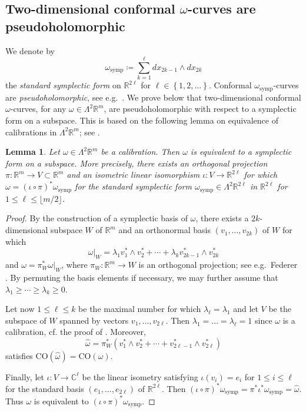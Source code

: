 \documentclass[a4paper,leqno,11pt]{amsart}
\numberwithin{equation}{section}
\newtheorem{lemma}[theorem]{Lemma}
\theoremstyle{remark}
\theoremstyle{remark}
\newcommand{\R}{\mathbb{R}}
\newcommand{\symp}{\mathrm{symp}}
\newcommand{\CO}{\mathrm{CO}}
\begin{document}
\subsection{Two-dimensional conformal $\omega$-curves are pseudoholomorphic}
\label{sec:two-dimensional-curves}
We denote by
\begin{equation*}
    \omega_{\symp}
    \coloneqq
    \sum_{ k = 1 }^{ \ell }
    dx_{2k-1} \wedge dx_{2k}
\end{equation*}
the \emph{standard symplectic form} on $\mathbb{R}^{ 2 \ell }$ for $\ell \in \left\{1,2,\dots\right\}$. Conformal $\omega_{\symp}$-curves are \emph{pseudoholomorphic}, see e.g.~\cite[Chapter 2]{McD:Sal:04}. We prove below that two-dimensional conformal $\omega$-curves, for any $\omega \in \Lambda^2 \mathbb{R}^m$, are pseudoholomorphic with respect to a symplectic form on a subspace. This is based on the following lemma on equivalence of calibrations in $\Lambda^2 \R^m$; see \cite[Theorem 7.16, p.~79]{Har:Law:82}.
\begin{lemma}
\label{lemma:symplectic-equivalence}
Let $\omega \in \Lambda^2 \R^m$ be a calibration. Then $\omega$ is equivalent to a symplectic form on a subspace. More precisely, there exists an orthogonal projection $\pi \colon \R^m \to V \subset \R^m$ and an isometric linear isomorphism $\iota \colon V \to \mathbb{R}^{2\ell}$ for which $\omega = ( \iota \circ \pi )^{*} \omega_{\symp}$ for the standard symplectic form $\omega_\symp \in \Lambda^2 \R^{2\ell}$ in $\R^{2\ell}$ for $1 \le \ell \le \lfloor m/2 \rfloor$.  
\end{lemma}

\begin{proof}
By the construction of a symplectic basis of $\omega$, there exists a $2k$-dimensional subspace $W$ of $\R^m$ and an orthonormal basis $(v_1,\ldots, v_{2k})$ of $W$ for which 
\[
\omega|_W = \lambda_1 v_1^* \wedge v_2^* + \cdots + \lambda_k v_{2k-1}^*\wedge v_{2k}^*
\]
and $\omega = \pi_W^* \omega|_W$, where $\pi_W \colon \R^m \to W$ is an orthogonal projection; see e.g.~Federer \cite[p.29]{Fed:69}. By permuting the basis elements if necessary, we may further assume that $\lambda_1 \ge \cdots \ge \lambda_k \ge 0$.

Let now $1\le \ell \le k$ be the maximal number for which $\lambda_\ell = \lambda_1$ and let $V$ be the subspace of $W$ spanned by vectors $v_1,\ldots, v_{2\ell}$. Then $\lambda_1 = \dots = \lambda_{\ell} = 1$ since $\omega$ is a calibration, cf. the proof of . Moreover, 
\[
\hat \omega = \pi_W^*(v_1^*\wedge v_2^* + \cdots + v_{2\ell-1}^* \wedge v_{2\ell}^*)
\]
satisfies $\CO(\hat \omega) = \CO(\omega)$.

Finally, let $\iota \colon V \to \mathbb{C}^{\ell}$ be the linear isometry satisfying $\iota(v_i) = e_i$ for $1 \leq i \leq \ell$ for the standard basis $(e_1,\ldots, e_{2\ell})$ of $\R^{2\ell}$. Then $( \iota \circ \pi )^*\omega_\symp = \pi^* \iota^* \omega_\symp = \hat \omega$. Thus $\omega$ is equivalent to $( \iota \circ \pi )^*\omega_\symp$.
\end{proof}
\end{document}
